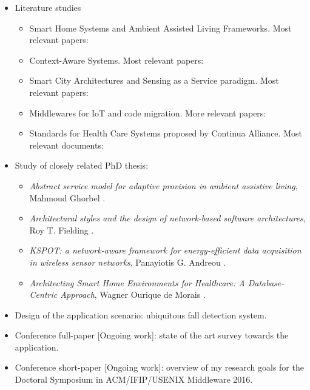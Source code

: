 \documentclass[]{report}
\begin{document}
\begin{itemize}
	\item Literature studies
	\begin{itemize}
		\item Smart Home Systems and Ambient Assisted Living Frameworks. Most relevant papers: \cite{acampora2013survey,blackman2016ambient,memon2014ambient,alam2012review}
		\item Context-Aware Systems. Most relevant papers: \cite{henricksen2005middleware,perera2014context}
		\item Smart City Architectures and Sensing as a Service paradigm. Most relevant papers: \cite{perera2014sensing,perera2014sensor,sheng2013sensing,zaslavsky2013sensing}
		\item Middlewares for IoT and code migration. More relevant papers: \cite{razzaque2016middleware,yu2013application,raychoudhury2013middleware}
		\item Standards for Health Care Systems proposed by Continua Alliance. Most relevant documents: \cite{schreier2014internet,rickardsson2016patient,clarke2007developing}
	\end{itemize}
	\item Study of closely related PhD thesis:
	\begin{itemize}
		\item \textit{Abstract service model for adaptive provision in ambient assistive living},  Mahmoud Ghorbel \cite{ghorbel2008abstract}.
		\item \textit{Architectural styles and the design of network-based software architectures}, Roy T. Fielding \cite{fielding2000architectural}.
		\item \textit{KSPOT: a network-aware framework for energy-efficient data acquisition in wireless sensor networks}, Panayiotis G. Andreou \cite{andreou2011kspot}.
		\item \textit{Architecting Smart Home Environments for Healthcare: A Database-Centric Approach}, Wagner Ourique de Morais \cite{ourique2015architecting}. 
	\end{itemize}
	\item Design of the application scenario: ubiquitous fall detection system.
	\item Conference full-paper [Ongoing work]: state of the art survey towards the application.
	\item Conference short-paper [Ongoing work]: overview of my research goals for the Doctoral Symposium in ACM/IFIP/USENIX Middleware 2016.
\end{itemize}
\end{document}

